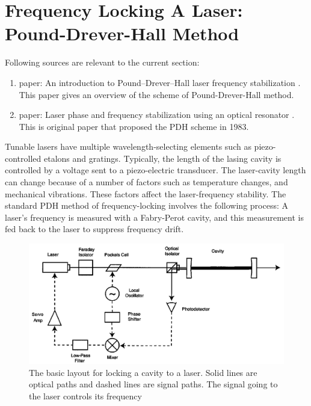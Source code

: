\documentclass[12pt]{report}
\begin{document}
\chapter{Frequency Locking A Laser: Pound-Drever-Hall Method}
Following sources are relevant to the current section: 
\begin{enumerate}
    \item paper: An introduction to Pound–Drever–Hall laser frequency stabilization \cite{PDHintro}. This paper gives an overview of the scheme of Pound-Drever-Hall method. 
    \item paper: Laser phase and frequency stabilization using an optical resonator \cite{PDH1983}. This is original paper that proposed the PDH scheme in 1983. 
\end{enumerate}

Tunable lasers have multiple wavelength-selecting elements such as piezo-controlled etalons and gratings. Typically, the length of the lasing cavity is controlled by a voltage sent to a piezo-electric transducer. The laser-cavity length can change because of a number of factors such as temperature changes, and mechanical vibrations. These factors affect the laser-frequency stability. The standard PDH method of frequency-locking involves the following process: A laser's frequency is measured with a Fabry-Perot cavity, and this measurement is fed back to the laser to suppress frequency drift. \cite{PDH1983}\cite{PDHintro}
\par
\begin{figure}[H]
    \centering
    \includegraphics[width=.8\textwidth]{PDHlayout.png}
    \caption{The basic layout for locking a cavity to a laser. Solid lines are optical paths and dashed lines are signal paths. The signal going to the laser controls its frequency \cite{PDHintro}}
    \label{fig:PDHlayout}
\end{figure}
\end{document}
